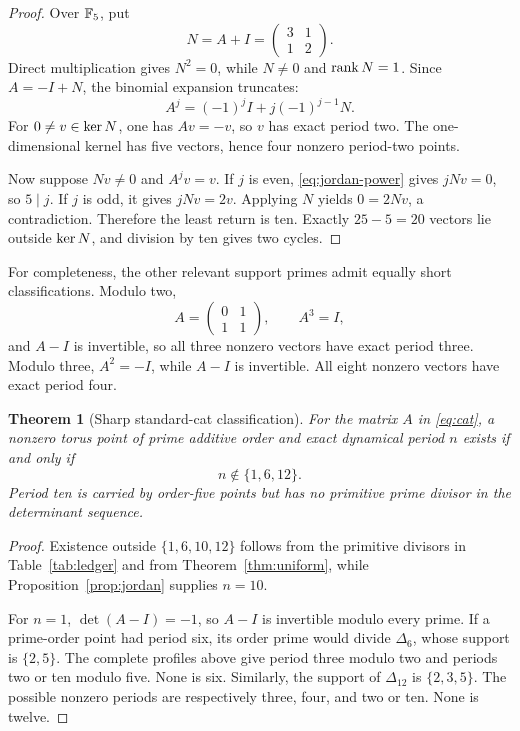 \documentclass[11pt]{article}
\newtheorem{theorem}{Theorem}[section]
\theoremstyle{definition}
\theoremstyle{remark}
\begin{document}
\begin{proof}
Over \(\mathbb{F}_5\), put
\begin{equation}
  N=A+I=\begin{pmatrix}3&1\\1&2\end{pmatrix}.
\end{equation}
Direct multiplication gives \(N^2=0\), while \(N\ne0\) and
\(\operatorname{rank} N=1\).  Since \(A=-I+N\), the binomial expansion truncates:
\begin{equation}
  A^j=(-1)^jI+j(-1)^{j-1}N.
  \label{eq:jordan-power}
\end{equation}
For \(0\ne v\in\operatorname{ker} N\), one has \(Av=-v\), so \(v\) has exact period
two.  The one-dimensional kernel has five vectors, hence four nonzero
period-two points.

Now suppose \(Nv\ne0\) and \(A^jv=v\).  If \(j\) is even,
\eqref{eq:jordan-power} gives \(jNv=0\), so \(5\mid j\).  If \(j\) is
odd, it gives \(jNv=2v\).  Applying \(N\) yields \(0=2Nv\), a
contradiction.  Therefore the least return is ten.  Exactly
\(25-5=20\) vectors lie outside \(\operatorname{ker} N\), and division by ten gives two
cycles.
\end{proof}

For completeness, the other relevant support primes admit equally short
classifications.  Modulo two,
\begin{equation}
 A=\begin{pmatrix}0&1\\1&1\end{pmatrix},\qquad A^3=I,
\end{equation}
and \(A-I\) is invertible, so all three nonzero vectors have exact period
three.  Modulo three, \(A^2=-I\), while \(A-I\) is invertible.  All eight
nonzero vectors have exact period four.

\begin{theorem}[Sharp standard-cat classification]
\label{thm:cat}
For the matrix \(A\) in \eqref{eq:cat}, a nonzero torus point of prime
additive order and exact dynamical period \(n\) exists if and only if
\begin{equation}
  n\notin\{1,6,12\}.
\end{equation}
Period ten is carried by order-five points but has no primitive prime
divisor in the determinant sequence.
\end{theorem}

\begin{proof}
Existence outside \(\{1,6,10,12\}\) follows from the primitive divisors in
Table~\ref{tab:ledger} and from Theorem~\ref{thm:uniform}, while
Proposition~\ref{prop:jordan} supplies \(n=10\).

For \(n=1\), \(\det(A-I)=-1\), so \(A-I\) is invertible modulo every
prime.  If a prime-order point had period six, its order prime would divide
\(\Delta_6\), whose support is \(\{2,5\}\).  The complete profiles above
give period three modulo two and periods two or ten modulo five.  None is
six.  Similarly, the support of \(\Delta_{12}\) is \(\{2,3,5\}\).  The
possible nonzero periods are respectively three, four, and two or ten.
None is twelve.
\end{proof}
\end{document}
